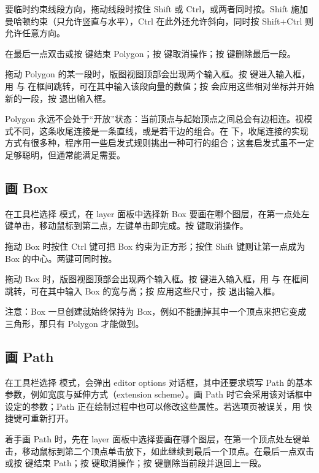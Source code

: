 要临时约束线段方向，拖动线段时按住 Shift 或 Ctrl，或两者同时按。Shift 施加曼哈顿约束（只允许竖直与水平），Ctrl 在此外还允许斜向，同时按 Shift+Ctrl 则允许任意方向。

在最后一点双击或按  键结束 Polygon；按  键取消操作；按  键删除最后一段。

拖动 Polygon 的某一段时，版图视图顶部会出现两个输入框。按  键进入输入框，用  与  在框间跳转，可在其中输入该段向量的数值；按  会应用这些相对坐标并开始新的一段，按  退出输入框。

Polygon 永远不会处于“开放”状态：当前顶点与起始顶点之间总会有边相连。视模式不同，这条收尾连接是一条直线，或是若干边的组合。在  下，收尾连接的实现方式有很多种，程序用一些启发式规则挑出一种可行的组合；这套启发式虽不一定足够聪明，但通常能满足需要。

\subsection{画 Box}\label{sec:create_box}

在工具栏选择  模式，在 layer 面板中选择新 Box 要画在哪个图层，在第一点处左键单击，移动鼠标到第二点，左键单击即完成。按  键取消操作。

拖动 Box 时按住 Ctrl 键可把 Box 约束为正方形；按住 Shift 键则让第一点成为 Box 的中心。两键可同时按。

拖动 Box 时，版图视图顶部会出现两个输入框。按  键进入输入框，用  与  在框间跳转，可在其中输入 Box 的宽与高；按  应用这些尺寸，按  退出输入框。

注意：Box 一旦创建就始终保持为 Box，例如不能删掉其中一个顶点来把它变成三角形，那只有 Polygon 才能做到。

\subsection{画 Path}\label{sec:create_path}

在工具栏选择  模式，会弹出 editor options 对话框，其中还要求填写 Path 的基本参数，例如宽度与延伸方式（extension scheme）。画 Path 时它会采用该对话框中设定的参数；Path 正在绘制过程中也可以修改这些属性。若选项页被误关，用  快捷键可重新打开。

着手画 Path 时，先在 layer 面板中选择要画在哪个图层，在第一个顶点处左键单击，移动鼠标到第二个顶点单击放下，如此继续到最后一个顶点。在最后一点双击或按  键结束 Path；按  键取消操作；按  键删除当前段并退回上一段。

